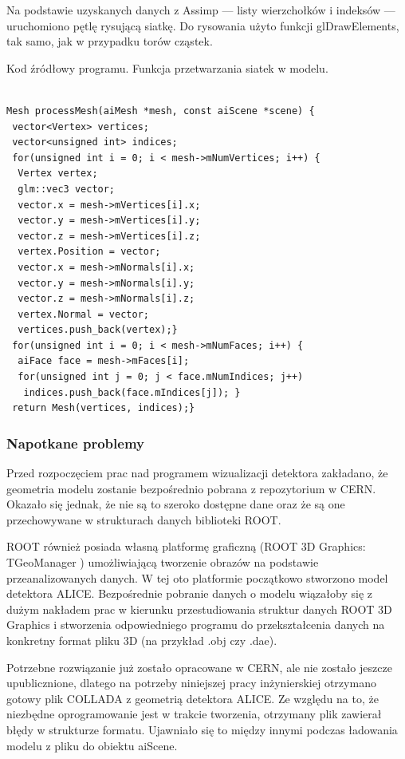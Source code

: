 Na podstawie uzyskanych danych z Assimp --- listy wierzchołków i indeksów --- uruchomiono pętlę rysującą siatkę. Do rysowania użyto funkcji glDrawElements, tak samo, jak w przypadku torów cząstek.

\begin{table}[H]
\caption{Kod źródłowy programu. Funkcja przetwarzania siatek w modelu.}
\label{tab14}
\begin{lstlisting}[frame=single]  % Start your code-block

Mesh processMesh(aiMesh *mesh, const aiScene *scene) {
 vector<Vertex> vertices;
 vector<unsigned int> indices;
 for(unsigned int i = 0; i < mesh->mNumVertices; i++) {
  Vertex vertex;
  glm::vec3 vector;
  vector.x = mesh->mVertices[i].x;
  vector.y = mesh->mVertices[i].y;
  vector.z = mesh->mVertices[i].z;
  vertex.Position = vector;
  vector.x = mesh->mNormals[i].x;
  vector.y = mesh->mNormals[i].y;
  vector.z = mesh->mNormals[i].z;
  vertex.Normal = vector;
  vertices.push_back(vertex);}
 for(unsigned int i = 0; i < mesh->mNumFaces; i++) {
  aiFace face = mesh->mFaces[i];
  for(unsigned int j = 0; j < face.mNumIndices; j++)
   indices.push_back(face.mIndices[j]); }
 return Mesh(vertices, indices);}
\end{lstlisting}
\end{table}

\subsubsection{Napotkane problemy}
Przed rozpoczęciem prac nad programem wizualizacji detektora zakładano, że geometria modelu zostanie bezpośrednio pobrana z repozytorium w CERN. Okazało się jednak, że nie są to szeroko dostępne dane oraz że są one przechowywane w strukturach danych biblioteki ROOT.

ROOT również posiada własną platformę graficzną (ROOT 3D Graphics: TGeoManager \cite{root3dGraphics}) umożliwiającą tworzenie obrazów na podstawie przeanalizowanych danych. W tej oto platformie początkowo stworzono model detektora ALICE. Bezpośrednie pobranie danych o modelu wiązałoby się z dużym nakładem prac w kierunku przestudiowania struktur danych ROOT 3D Graphics i stworzenia odpowiedniego programu do przekształcenia danych na konkretny format pliku 3D (na przykład .obj czy .dae).

Potrzebne rozwiązanie już zostało opracowane w CERN, ale nie zostało jeszcze upublicznione, dlatego na potrzeby niniejszej pracy inżynierskiej otrzymano gotowy plik COLLADA z geometrią detektora ALICE. Ze względu na to, że niezbędne oprogramowanie jest w trakcie tworzenia, otrzymany plik zawierał błędy w strukturze formatu. Ujawniało się to między innymi podczas ładowania modelu z pliku do obiektu aiScene.

